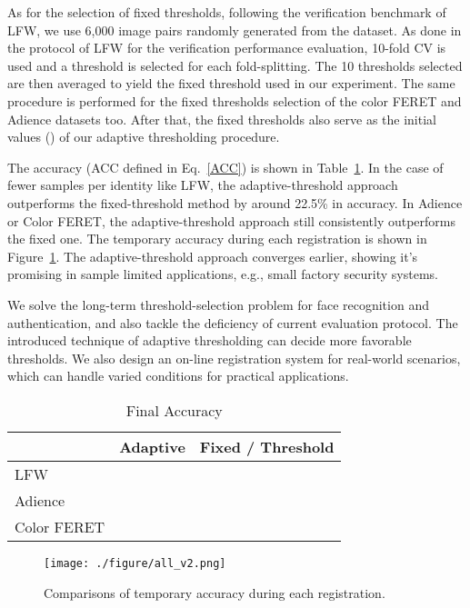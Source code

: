 \documentclass[10pt,twocolumn]{article}
\begin{document}
As for the selection of fixed thresholds, following the verification benchmark of LFW, we use 6,000 image pairs randomly generated from the dataset. As done in the protocol of LFW for the verification performance evaluation, 10-fold CV is used and a threshold is selected for each fold-splitting. The 10 thresholds selected are then averaged to yield the fixed threshold used in our experiment. The same procedure is performed for the fixed thresholds selection of the color FERET and Adience datasets too.
After that, the fixed thresholds also serve as the initial values () of our adaptive thresholding procedure.







The accuracy (ACC defined in Eq.~\ref{ACC}) is shown in Table~\ref{tab:experiment-result}.
In the case of fewer samples per identity like LFW, the adaptive-threshold approach outperforms the fixed-threshold method by around 22.5\% in accuracy. In Adience or Color FERET, the adaptive-threshold approach still consistently outperforms the fixed one.
The temporary accuracy during each registration is shown in Figure~\ref{fig:result}. The adaptive-threshold approach converges earlier, showing it's promising in sample limited applications, e.g., small factory security systems. 


We solve the long-term threshold-selection problem for face recognition and authentication, and also tackle the deficiency of current evaluation protocol. The introduced technique of adaptive thresholding can decide more favorable thresholds. We also design an on-line registration system for real-world scenarios, which can handle varied conditions for practical applications.


\begin{table}[t]
\centering
\caption{Final Accuracy}
\label{tab:experiment-result}
\begin{tabular}{lcc}
\toprule
            &  Adaptive & Fixed / Threshold \\ \midrule
LFW         &  & \\
Adience     &  & \\
Color FERET &  & \\ \midrule
\end{tabular}
\end{table}




\begin{figure}[t]
\centering
\vspace{-10pt}
\texttt{[image: ./figure/all\_v2.png]}
\caption{Comparisons of temporary accuracy during each registration.}
\label{fig:result}
\end{figure}


\nocite{}


\end{document}
